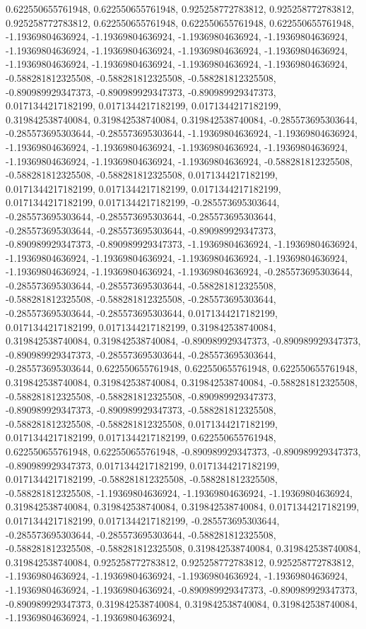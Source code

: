 \documentclass[
  ,man]{apa6}
\begin{document}
0.622550655761948, 0.622550655761948, 0.925258772783812, 0.925258772783812, 0.925258772783812, 0.622550655761948, 0.622550655761948, 0.622550655761948, -1.19369804636924, -1.19369804636924, -1.19369804636924, -1.19369804636924, -1.19369804636924, -1.19369804636924, -1.19369804636924, -1.19369804636924, -1.19369804636924, -1.19369804636924, -1.19369804636924, -1.19369804636924, -0.588281812325508, -0.588281812325508, -0.588281812325508, -0.890989929347373, -0.890989929347373, -0.890989929347373, 0.0171344217182199,
0.0171344217182199, 0.0171344217182199, 0.319842538740084, 0.319842538740084, 0.319842538740084, -0.285573695303644, -0.285573695303644, -0.285573695303644, -1.19369804636924, -1.19369804636924, -1.19369804636924, -1.19369804636924, -1.19369804636924, -1.19369804636924, -1.19369804636924, -1.19369804636924, -1.19369804636924, -0.588281812325508, -0.588281812325508, -0.588281812325508, 0.0171344217182199, 0.0171344217182199, 0.0171344217182199, 0.0171344217182199, 0.0171344217182199, 0.0171344217182199,
-0.285573695303644, -0.285573695303644, -0.285573695303644, -0.285573695303644, -0.285573695303644, -0.285573695303644, -0.890989929347373, -0.890989929347373, -0.890989929347373, -1.19369804636924, -1.19369804636924, -1.19369804636924, -1.19369804636924, -1.19369804636924, -1.19369804636924, -1.19369804636924, -1.19369804636924, -1.19369804636924, -0.285573695303644, -0.285573695303644, -0.285573695303644, -0.588281812325508, -0.588281812325508, -0.588281812325508, -0.285573695303644, -0.285573695303644,
-0.285573695303644, 0.0171344217182199, 0.0171344217182199, 0.0171344217182199, 0.319842538740084, 0.319842538740084, 0.319842538740084, -0.890989929347373, -0.890989929347373, -0.890989929347373, -0.285573695303644, -0.285573695303644, -0.285573695303644, 0.622550655761948, 0.622550655761948, 0.622550655761948, 0.319842538740084, 0.319842538740084, 0.319842538740084, -0.588281812325508, -0.588281812325508, -0.588281812325508, -0.890989929347373, -0.890989929347373, -0.890989929347373, -0.588281812325508,
-0.588281812325508, -0.588281812325508, 0.0171344217182199, 0.0171344217182199, 0.0171344217182199, 0.622550655761948, 0.622550655761948, 0.622550655761948, -0.890989929347373, -0.890989929347373, -0.890989929347373, 0.0171344217182199, 0.0171344217182199, 0.0171344217182199, -0.588281812325508, -0.588281812325508, -0.588281812325508, -1.19369804636924, -1.19369804636924, -1.19369804636924, 0.319842538740084, 0.319842538740084, 0.319842538740084, 0.0171344217182199, 0.0171344217182199, 0.0171344217182199,
-0.285573695303644, -0.285573695303644, -0.285573695303644, -0.588281812325508, -0.588281812325508, -0.588281812325508, 0.319842538740084, 0.319842538740084, 0.319842538740084, 0.925258772783812, 0.925258772783812, 0.925258772783812, -1.19369804636924, -1.19369804636924, -1.19369804636924, -1.19369804636924, -1.19369804636924, -1.19369804636924, -0.890989929347373, -0.890989929347373, -0.890989929347373, 0.319842538740084, 0.319842538740084, 0.319842538740084, -1.19369804636924, -1.19369804636924,
\end{document}
